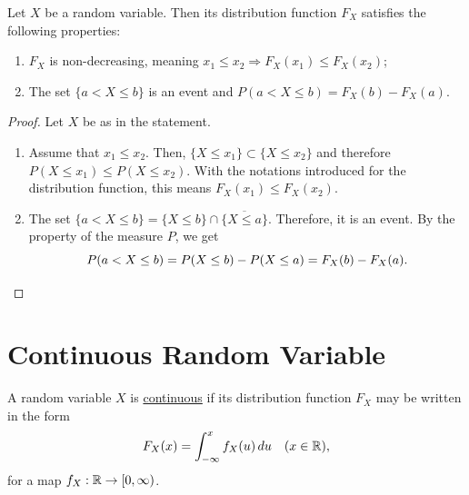 \begin{theorem}
Let $X$ be a random variable. Then its distribution function $F_X$ satisfies the following properties:
    \begin{enumerate}[label=\alph*)]
        \item $F_X$ is non-decreasing, meaning $x_1 \leq x_2 \Rightarrow F_X (x_1) \leq F_X (x_2)$;
        \item The set $\{ a < X \leq b \}$ is an event and $P (a < X \leq b ) = F_X (b) - F_X (a)$. 
    \end{enumerate}
\end{theorem}
\begin{proof}
Let $X$ be as in the statement.
    \begin{enumerate}[label=\alph*)]
        \item Assume that $x_1 \leq x_2$. Then, $\{ X \leq x_1 \} \subset \{ X \leq x_2 \}$ and therefore $P (X \leq x_1) \leq P (X \leq x_2 )$. With the notations introduced for the distribution function, this means $F_X (x_1) \leq F_X (x_2)$. 
        \item The set $\{ a < X \leq b \} = \{ X \leq b \} \cap \overline{ \{ X \leq a \}}$. Therefore, it is an event. By the property of the measure $P$, we get
            \[
                P (a < X \leq b) = P (X \leq b) - P (X \leq a ) = F_X (b) - F_X (a) . \qedhere
            \]
    \end{enumerate}
\end{proof}

\section{Continuous Random Variable}

\begin{definition}
A random variable $X$ is \underline{continuous} if its distribution function $F_X$ may be written in the form
\[
    F_X (x) = \int_{-\infty}^x f_X (u) \, du \quad (x \in \mathbb{R} ) ,
\]
for a map $f_X : \mathbb{R} \rightarrow [0, \infty )$.  
\end{definition}

